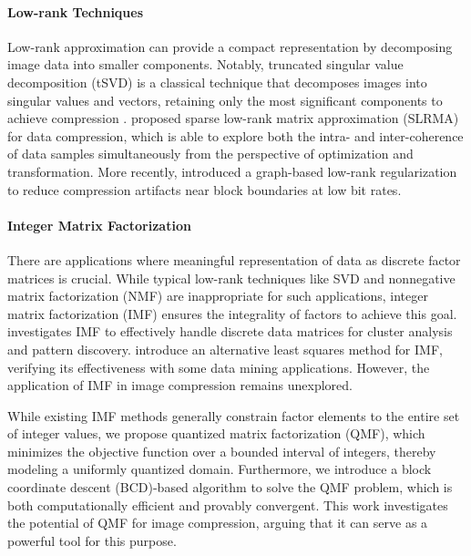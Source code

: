 \paragraph{Low-rank Techniques}
Low-rank approximation can provide a compact representation by decomposing image data into smaller components. Notably, truncated singular value decomposition (tSVD) is a classical technique that decomposes images into singular values and vectors, retaining only the most significant components to achieve compression \cite{andrews1976singular, prasantha2007image}. \citet{hou2015sparse} proposed sparse low-rank matrix approximation (SLRMA) for data compression, which is able to explore both the intra- and inter-coherence of data samples simultaneously from the perspective of optimization and transformation.
More recently, \citet{yuan2020image} introduced a graph-based low-rank regularization to reduce compression artifacts near block boundaries at low bit rates.

\paragraph{Integer Matrix Factorization}
There are applications where meaningful representation of data as discrete factor matrices is crucial. While typical low-rank techniques like SVD and nonnegative matrix factorization (NMF) are inappropriate for such applications, integer matrix factorization (IMF) ensures the integrality of factors to achieve this goal. \citet{lin2005integer} investigates IMF to effectively handle discrete data matrices for cluster analysis and pattern discovery. \citet{dong2018integer} introduce an alternative least squares method for IMF, verifying its effectiveness with some data mining applications. However, the application of IMF in image compression remains unexplored.

While existing IMF methods generally constrain factor elements to the entire set of integer values, we propose quantized matrix factorization (QMF), which minimizes the objective function over a bounded interval of integers, thereby modeling a uniformly quantized domain. Furthermore, we introduce a block coordinate descent (BCD)-based algorithm to solve the QMF problem, which is both computationally efficient and provably convergent. This work investigates the potential of QMF for image compression, arguing that it can serve as a powerful tool for this purpose.